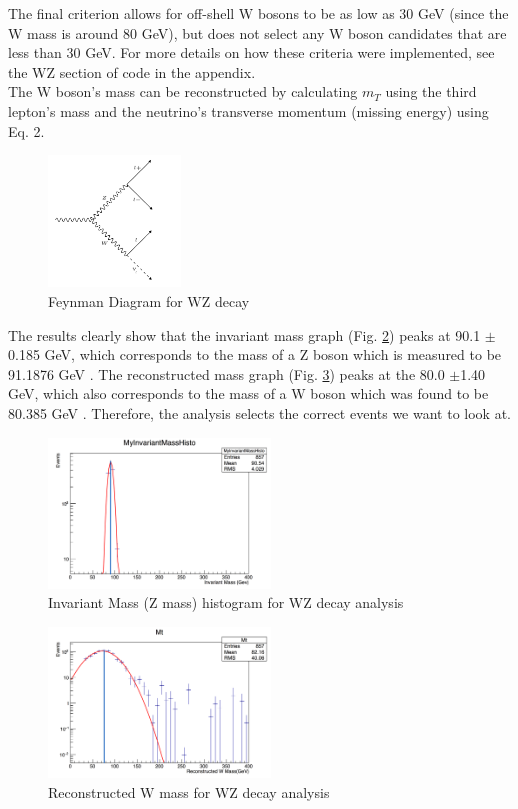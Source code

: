 \documentclass[runningheads,a4paper]{llncs}
\begin{document}
The final criterion allows for off-shell W bosons to be as low as 30 GeV (since the W mass is around 80 GeV), but does not select any W boson candidates that are less than 30 GeV. For more details on how these criteria were implemented, see the WZ section of code in the appendix. \\

The W boson's mass can be reconstructed by calculating ${m}_{T}$ using the third lepton's mass and the neutrino's transverse momentum (missing energy) using Eq. 2.

\begin{figure}
\centering
\includegraphics[height=3.5cm]{WZ_feynman.jpg}
\caption{Feynman Diagram for WZ decay}
\label{fig:WZF}
\end{figure}

The results clearly show that the invariant mass graph (Fig. \ref{fig:WZIM}) peaks at 90.1 $\pm$0.185 GeV, which corresponds to the mass of a Z boson which is measured to be 91.1876 GeV \cite{BeringerZ}. The reconstructed mass graph (Fig. \ref{fig:WZMT}) peaks at the 80.0 $\pm$1.40 GeV, which also corresponds to the mass of a W boson which was found to be 80.385 GeV \cite{BeringerW}. Therefore, the analysis selects the correct events we want to look at. \\

\begin{figure}[H]
\centering
\includegraphics[height=4cm]{WZ_IM.jpg}
\caption{Invariant Mass (Z mass) histogram for WZ decay analysis}
\label{fig:WZIM}
\end{figure}

\begin{figure}[H]
\centering
\includegraphics[height=4cm]{WZ_Mt.jpg}
\caption{Reconstructed W mass for WZ decay analysis}
\label{fig:WZMT}
\end{figure}
\end{document}
